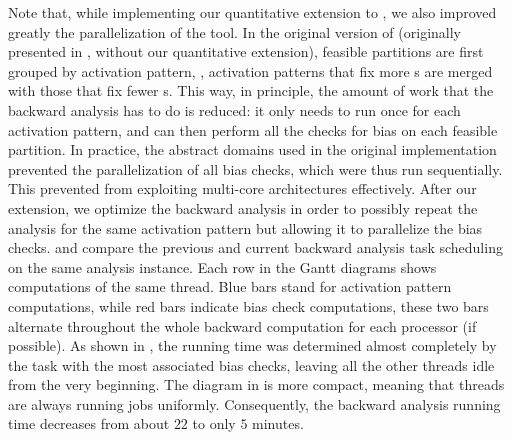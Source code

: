 

Note that, while implementing our quantitative extension to \libra, we also improved greatly the parallelization of the tool.
In the original version of \libra (originally presented in , without our quantitative extension), feasible partitions are first grouped by activation pattern, \ie, activation patterns that fix more \relu s are merged with those that fix fewer \relu s.
This way, in principle, the amount of work that the backward analysis has to do is reduced: it only needs to run once for each activation pattern, and can then perform all the checks for bias on each feasible partition. In practice, the abstract domains used in the original implementation prevented the parallelization of all bias checks, which were thus run sequentially. This prevented \libra from exploiting multi-core architectures effectively. %
%
After our extension, we optimize the backward analysis in order to possibly repeat the analysis for the same activation pattern but allowing it to parallelize the bias checks.
 and  compare the previous and current backward analysis task scheduling on the same analysis instance. Each row in the Gantt diagrams shows computations of the same thread. Blue bars stand for activation pattern computations, while red bars indicate bias check computations, these two bars alternate throughout the whole backward computation for each processor (if possible).
As shown in , the running time was determined almost completely by the task with the most associated bias checks, leaving all the other threads idle from the very beginning. The diagram in  is more compact, meaning that threads are always running jobs uniformly. Consequently, the backward analysis running time decreases from about $22$ to only $5$ minutes.


